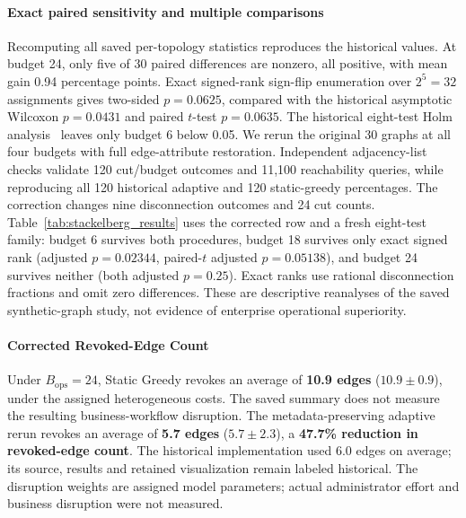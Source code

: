\paragraph{Exact paired sensitivity and multiple comparisons}
Recomputing all saved per-topology statistics reproduces the historical values. At budget 24, only five of 30 paired differences are nonzero, all positive, with mean gain 0.94 percentage points. Exact signed-rank sign-flip enumeration over $2^5=32$ assignments gives two-sided $p=0.0625$, compared with the historical asymptotic Wilcoxon $p=0.0431$ and paired $t$-test $p=0.0635$. The historical eight-test Holm analysis~\cite{holm1979simple} leaves only budget 6 below 0.05. We rerun the original 30 graphs at all four budgets with full edge-attribute restoration. Independent adjacency-list checks validate 120 cut/budget outcomes and 11,100 reachability queries, while reproducing all 120 historical adaptive and 120 static-greedy percentages. The correction changes nine disconnection outcomes and 24 cut counts. Table~\ref{tab:stackelberg_results} uses the corrected row and a fresh eight-test family: budget 6 survives both procedures, budget 18 survives only exact signed rank (adjusted $p=0.02344$, paired-$t$ adjusted $p=0.05138$), and budget 24 survives neither (both adjusted $p=0.25$). Exact ranks use rational disconnection fractions and omit zero differences. These are descriptive reanalyses of the saved synthetic-graph study, not evidence of enterprise operational superiority.

\paragraph{Corrected Revoked-Edge Count}
Under $B_{\text{ops}} = 24$, Static Greedy revokes an average of \textbf{10.9 edges} ($10.9 \pm 0.9$), under the assigned heterogeneous costs. The saved summary does not measure the resulting business-workflow disruption. The metadata-preserving adaptive rerun revokes an average of \textbf{5.7 edges} ($5.7 \pm 2.3$), a \textbf{47.7\% reduction in revoked-edge count}. The historical implementation used 6.0 edges on average; its source, results and retained visualization remain labeled historical. The disruption weights are assigned model parameters; actual administrator effort and business disruption were not measured.



